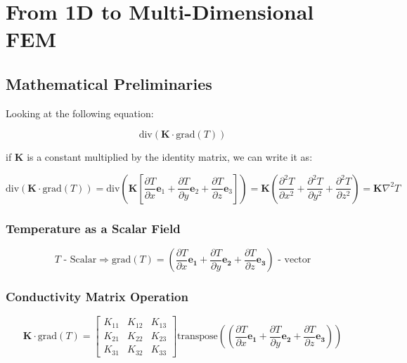 \documentclass[
  11pt,
  a4paper,
]{scrbook}
\begin{document}
\chapter{From 1D to Multi-Dimensional
FEM}\label{from-1d-to-multi-dimensional-fem}

\section{Mathematical Preliminaries}\label{mathematical-preliminaries}

Looking at the following equation:

\[
\text{div}(\mathbf{K}\cdot \text{grad}(T))
\]

if \(\mathbf{K}\) is a constant multiplied by the identity matrix, we
can write it as:

\[
\text{div}(\mathbf{K}\cdot \text{grad}(T))  = \text{div}(\mathbf{K} \left [\frac{\partial T}{\partial x} \mathbf{e}_1 +\frac{\partial T}{\partial y} \mathbf{e}_2+\frac{\partial T}{\partial z} \mathbf{e}_3 \right ]) = \mathbf{K} \left ( \frac{\partial^2 T}{\partial x^2}+\frac{\partial^2 T}{\partial y^2}+\frac{\partial^2 T}{\partial z^2} \right) = \mathbf{K}\nabla^2T
\]

\subsection{Temperature as a Scalar
Field}\label{temperature-as-a-scalar-field}

\[
T \text{ - Scalar} \Rightarrow \text{grad}(T) = \left(\frac{\partial T}{\partial x}\mathbf{e_1} + \frac{\partial T}{\partial y}\mathbf{e_2} + \frac{\partial T}{\partial z}\mathbf{e_3}\right) \text{ - vector}
\]

\subsection{Conductivity Matrix
Operation}\label{conductivity-matrix-operation}

\[
\mathbf{K} \cdot \text{grad}(T) = \begin{bmatrix} K_{11} & K_{12} & K_{13} \\ K_{21} & K_{22} & K_{23} \\ K_{31} & K_{32} & K_{33} \end{bmatrix} \text{transpose}\left(\left(\frac{\partial T}{\partial x}\mathbf{e_1} + \frac{\partial T}{\partial y}\mathbf{e_2} + \frac{\partial T}{\partial z}\mathbf{e_3}\right)\right)
\]
\end{document}
